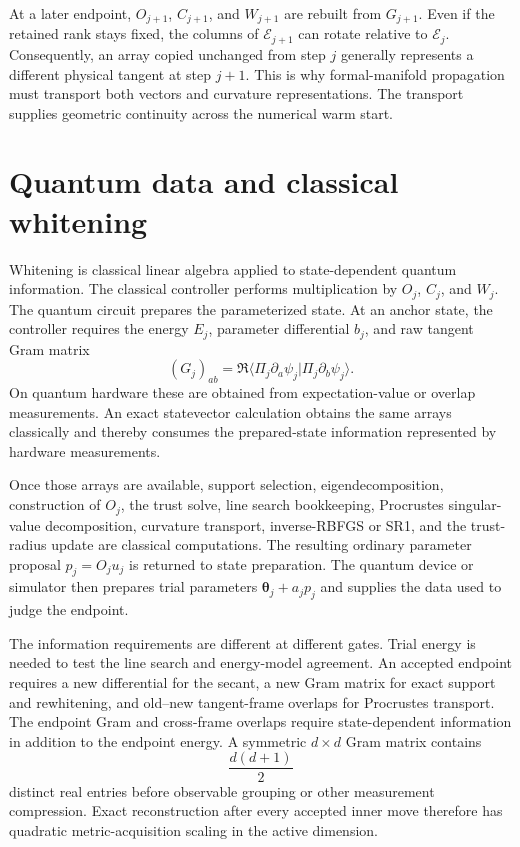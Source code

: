 \documentclass[10pt,twocolumn]{article}
\begin{document}
At a later endpoint, \(O_{j+1}\), \(C_{j+1}\), and \(W_{j+1}\) are rebuilt
from \(G_{j+1}\). Even if the retained rank stays fixed, the columns of
\(\mathcal E_{j+1}\) can rotate relative to \(\mathcal E_j\). Consequently,
an array copied unchanged from step \(j\) generally represents a different
physical tangent at step \(j+1\). This is why formal-manifold propagation must
transport both vectors and curvature representations. The transport supplies
geometric continuity across the numerical warm start.

\section*{Quantum data and classical whitening}

Whitening is classical linear algebra applied to state-dependent quantum
information. The classical controller performs multiplication by \(O_j\),
\(C_j\), and \(W_j\). The quantum circuit prepares the parameterized
state. At an anchor state, the controller requires the energy \(E_j\),
parameter differential \(b_j\), and raw tangent Gram matrix
\begin{equation}
(G_j)_{ab}
=\Re\langle\Pi_j\partial_a\psi_j|
\Pi_j\partial_b\psi_j\rangle.
\label{eq:fm-measured-gram-entry}
\end{equation}
On quantum hardware these are obtained from expectation-value or overlap
measurements. An exact statevector calculation obtains the same arrays
classically and thereby consumes the prepared-state information represented by
hardware measurements.

Once those arrays are available, support selection, eigendecomposition,
construction of \(O_j\), the trust solve, line search bookkeeping,
Procrustes singular-value decomposition, curvature transport, inverse-RBFGS or
SR1, and the trust-radius update are classical computations. The resulting
ordinary parameter proposal \(p_j=O_ju_j\) is returned to state preparation.
The quantum device or simulator then prepares trial parameters
\(\bm\theta_j+a_jp_j\) and supplies the data used to judge the endpoint.

The information requirements are different at different gates. Trial energy
is needed to test the line search and energy-model agreement. An accepted
endpoint requires a new differential for the secant, a new Gram matrix for
exact support and rewhitening, and old--new tangent-frame overlaps for
Procrustes transport. The endpoint Gram and cross-frame overlaps require
state-dependent information in addition to the endpoint energy. A symmetric
\(d\times d\) Gram matrix contains
\begin{equation}
\frac{d(d+1)}{2}
\label{eq:fm-gram-entry-count}
\end{equation}
distinct real entries before observable grouping or other measurement
compression. Exact reconstruction after every accepted inner move therefore
has quadratic metric-acquisition scaling in the active dimension.
\end{document}
